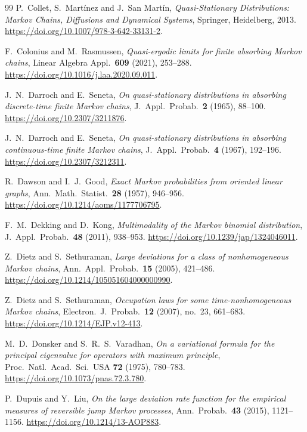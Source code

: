 \documentclass[EJP,preprint]{ejpecp}
\theoremstyle{ejpecpbodyit}
\begin{document}
\begin{thebibliography}{99}
P.~Collet, S.~Mart\'inez and J.~San Mart\'in, \emph{Quasi-Stationary
Distributions: Markov Chains, Diffusions and Dynamical Systems}, Springer,
Heidelberg, 2013. \url{https://doi.org/10.1007/978-3-642-33131-2}.

F.~Colonius and M.~Rasmussen, \emph{Quasi-ergodic limits for finite
absorbing Markov chains}, Linear Algebra Appl.~\textbf{609} (2021), 253--288.
\url{https://doi.org/10.1016/j.laa.2020.09.011}.

J.~N.~Darroch and E.~Seneta, \emph{On quasi-stationary distributions in
absorbing discrete-time finite Markov chains}, J.~Appl.~Probab.~\textbf{2}
(1965), 88--100. \url{https://doi.org/10.2307/3211876}.

J.~N.~Darroch and E.~Seneta, \emph{On quasi-stationary distributions in
absorbing continuous-time finite Markov chains}, J.~Appl.~Probab.~\textbf{4}
(1967), 192--196. \url{https://doi.org/10.2307/3212311}.

R.~Dawson and I.~J.~Good, \emph{Exact Markov probabilities from oriented
linear graphs}, Ann.~Math.~Statist.~\textbf{28} (1957), 946--956.
\url{https://doi.org/10.1214/aoms/1177706795}.

F.~M.~Dekking and D.~Kong, \emph{Multimodality of the Markov binomial distribution},
J.~Appl.~Probab.\ \textbf{48} (2011), 938--953.
\url{https://doi.org/10.1239/jap/1324046011}.

Z.~Dietz and S.~Sethuraman, \emph{Large deviations for a class of
nonhomogeneous Markov chains}, Ann.~Appl.~Probab.~\textbf{15} (2005),
421--486. \url{https://doi.org/10.1214/105051604000000990}.

Z.~Dietz and S.~Sethuraman, \emph{Occupation laws for some
time-nonhomogeneous Markov chains}, Electron.~J.~Probab.~\textbf{12} (2007),
no.~23, 661--683. \url{https://doi.org/10.1214/EJP.v12-413}.

M.~D.~Donsker and S.~R.~S.~Varadhan, \emph{On a variational formula for the
principal eigenvalue for operators with maximum principle}, Proc.~Natl.~Acad.~Sci.~USA
\textbf{72} (1975), 780--783. \url{https://doi.org/10.1073/pnas.72.3.780}.

P.~Dupuis and Y.~Liu, \emph{On the large deviation rate function for the
empirical measures of reversible jump Markov processes}, Ann.~Probab.~\textbf{43}
(2015), 1121--1156. \url{https://doi.org/10.1214/13-AOP883}.


\end{thebibliography}
\end{document}

